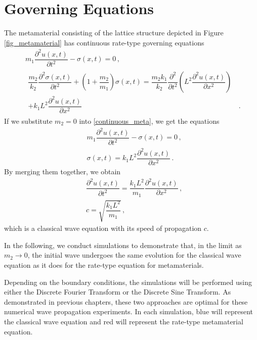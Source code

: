 \documentclass[11pt,a4paper,oneside,openright]{report} %
\begin{document}
\section{Governing Equations}
\noindent
The metamaterial consisting of the lattice structure depicted in Figure \ref{fig_metamaterial} has continuous rate-type governing equations
\begin{subequations}\label{continuous_meta}
    \begin{align}
        & m_1 \dfrac{\partial^2 u(x,t)}{\partial t^2} - \sigma(x,t)  = 0 \, , \\[5pt]
        & \begin{aligned}
            \dfrac{m_2}{k_2} \dfrac{\partial^2 \sigma(x,t)}{\partial t^2}  + \left(1 + \dfrac{m_2}{m_1} \right) \sigma(x,t)  = \dfrac{m_2 k_1}{k_2} \dfrac{\partial^2 }{\partial t^2 } \left(L^2 \dfrac{\partial^2 u(x,t)}{\partial x^2} \right) & \\ + k_1 L^2 \dfrac{\partial^2 u(x,t)}{\partial x^2} & \, .
        \end{aligned}
    \end{align}
\end{subequations}
If we substitute $m_2 = 0$ into \eqref{continuous_meta}, we get the equations
\begin{subequations}\label{}
    \begin{align}
        & m_1 \dfrac{\partial^2 u(x,t)}{\partial t^2} - \sigma(x,t)  = 0 \, , \\[5pt]
        & \sigma(x,t)  = k_1 L^2 \dfrac{\partial^2 u(x,t)}{\partial x^2} \, .
    \end{align}
\end{subequations}
By merging them together, we obtain
\begin{subequations}
    \begin{align}
    & \dfrac{\partial^2 u(x,t)}{\partial t^2} = \dfrac{k_1 L^2}{m_1} \dfrac{\partial^2 u(x,t)}{\partial x^2} \, , \\
    & c = \sqrt{\dfrac{k_1 L^2}{m_1}} \, ,
    \end{align}
\end{subequations}
which is a classical wave equation with its speed of propagation $c$.

In the following, we conduct simulations to demonstrate that, in the limit as~\hbox{$m_2 \to 0$}, the initial wave undergoes the same evolution for the classical wave equation as it does for the rate-type equation for metamaterials.

Depending on the boundary conditions, the simulations will be performed using either the Discrete Fourier Transform or the Discrete Sine Transform. As demonstrated in previous chapters, these two approaches are optimal for these numerical wave propagation experiments. In each simulation, blue will represent the classical wave equation and red will represent the rate-type metamaterial equation.
\end{document}
